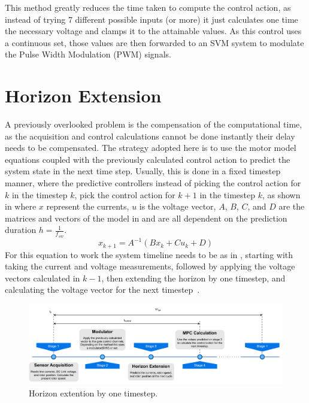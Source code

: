 \documentclass[9pt,conference]{IEEEtran}
\begin{document}
This method greatly reduces the time taken to compute the control action, as instead of trying 7 different possible inputs (or more) it just calculates one time the necessary voltage and clamps it to the attainable values. As this control uses a continuous set, those values are then forwarded to an SVM system to modulate the Pulse Width Modulation (PWM) signals.

\section {Horizon Extension}

A previously overlooked problem is the compensation of the computational time, as the acquisition and control calculations cannot be done instantly their delay needs to be compensated. The strategy adopted here is to use the motor model equations  coupled with the previously calculated control action to predict the system state in the next time step. Usually, this is done in a fixed timestep manner, where the predictive controllers instead of picking the control action for $k$ in the timestep $k$, pick the control action for $k+1$ in the timestep $k$, as shown in  where $x$ represent the currents, $u$ is the voltage vector, $A$, $B$, $C$, and $D$ are the matrices and vectors of the model in  and are all dependent on the prediction duration $h = \frac{1}{f_{sw}}$.
\begin{equation}
	x_{k+1} = A^{-1} \left (B x_k + C u_k + D\right )
	\label{eq:horizon_default}
\end{equation}
For this equation to work the system timeline needs to be as in , starting with taking the current and voltage measurements, followed by applying the voltage vectors calculated in $k-1$, then extending the horizon by one timestep, and calculating the voltage vector for the next timestep~\cite{Vazquez:MPC_uses:2014}.

\begin{figure}[!htb]
	\centering
	\includegraphics[width=.8\linewidth]{Figures/Horizon Extension default Timeline.pdf}
	\caption[Horizon extention by one timestep.]{Horizon extention by one timestep.}
	\label{fig:horizon_default_timeline} %
\end{figure}
\end{document}
